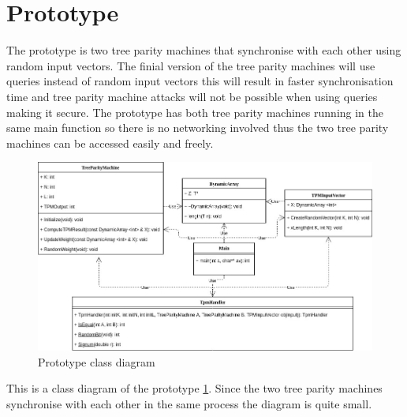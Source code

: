 \section{Prototype}
The prototype is two tree parity machines that synchronise with each other using random input vectors. The finial version of the tree parity machines will use queries instead of random input vectors this will result in faster synchronisation time and tree parity machine attacks will not be possible when using queries making it secure.
The prototype has both tree parity machines running in the same main function so there is no networking involved thus the two tree parity machines can be accessed easily and freely.   
\begin{figure}[!h]
  \centering
      \includegraphics[width=1\textwidth]{Figures/TreeParityMachine.jpg}
  \caption[Prototype class diagram]{Prototype class diagram}
  \label{fig:prototype}
\end{figure}

\FloatBarrier

This is a class diagram of the prototype \ref{fig:prototype}. Since the two tree parity machines synchronise with each other in the same process the diagram is quite small.

